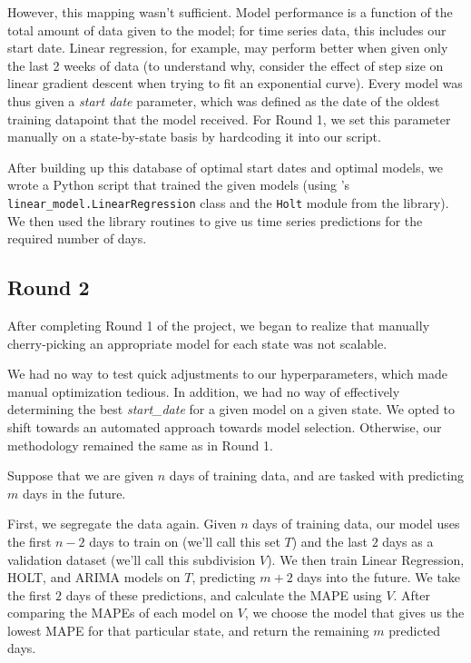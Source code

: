 \documentclass[sigconf,nonacm]{acmart}
\begin{document}
However, this mapping wasn't sufficient. 
Model performance is a function of the total amount of data given to the model;
for time series data, this includes our start date. Linear regression, for
example, may perform better when given only the last 2 weeks of data (to
understand why, consider the effect of step size on linear gradient descent
when trying to fit an exponential curve). 
Every model was thus given a \emph{start date} parameter, which was defined as
the date of the oldest training datapoint that the model received. 
For Round 1, we set this parameter manually on a state-by-state basis by
hardcoding it into our script. 

After building up this database of optimal start dates and optimal models, we
wrote a Python script that trained the given models (using \cite{scikit-learn}'s
\texttt{linear_model.LinearRegression} class and the \texttt{Holt} module from
the \cite{statsmodels} library). We then used the library routines to give us
time series predictions for the required number of days. 


\subsection{Round 2}


After completing Round 1 of the project, we began to realize that manually
cherry-picking an appropriate model for each state was not scalable. 

We had no way to test quick adjustments to our hyperparameters, which made
manual optimization tedious. In addition, we had no way of effectively
determining the best \emph{start_date} for a given model on a given state. 
We opted to shift towards an automated approach towards model selection. 
Otherwise, our methodology remained the same as in Round 1. 

Suppose that we are given $n$ days of training data, and are tasked with
predicting $m$ days in the future. 

First, we segregate the data again. Given $n$ days of training data, our model
uses the first $n-2$ days to train on (we'll call this set $T$) and the last
$2$ days as a validation dataset (we'll call this subdivision $V$). We then
train Linear Regression, HOLT, and ARIMA models on $T$, predicting $m+2$ days
into the future. We take the first $2$ days of these predictions, and calculate
the MAPE using $V$. After comparing the MAPEs of each model on $V$, we choose
the model that gives us the lowest MAPE for that particular state, and return
the remaining $m$ predicted days. 
\end{document}
